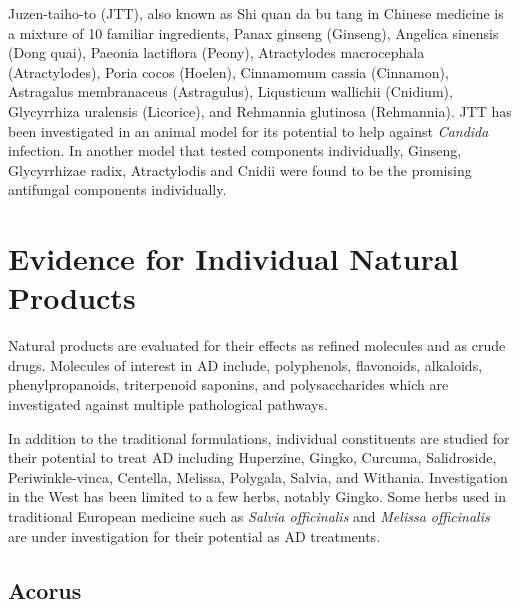 \documentclass[twocolumn]{article}
\begin{document}
Juzen-taiho-to (JTT), also known as
Shi quan da bu tang in Chinese medicine
is a mixture of 10 familiar ingredients,
Panax ginseng (Ginseng),
Angelica sinensis (Dong quai),
Paeonia lactiflora (Peony),
Atractylodes macrocephala (Atractylodes),
Poria cocos (Hoelen),
Cinnamomum cassia (Cinnamon),
Astragalus membranaceus (Astragulus),
Liqusticum wallichii (Cnidium),
Glycyrrhiza uralensis (Licorice),
and Rehmannia glutinosa (Rehmannia).
JTT has been investigated in an animal model
for its potential to help against \textit{Candida}
infection.
\cite{akagawa1996protection}
In another model that tested components individually,
Ginseng, Glycyrrhizae radix, Atractylodis and Cnidii
were found to be the promising antifungal components individually.
\cite{abe1998protective}



%
%

\section{Evidence for Individual Natural Products}


Natural products are evaluated for their effects
as refined molecules and
as crude drugs.
Molecules of interest in AD include,
polyphenols,
flavonoids,
alkaloids,
phenylpropanoids,
triterpenoid saponins,
and polysaccharides
which are investigated
against multiple pathological pathways.
\cite{
darvesh2010oxidative,
gao2013research
}

In addition to the traditional formulations,
individual constituents are studied for their potential
to treat AD including
Huperzine,
Gingko,
Curcuma,
Salidroside,
Periwinkle-vinca,
Centella,
Melissa,
Polygala,
Salvia,
and Withania.
\cite{sun2013traditional}
Investigation in the West has been limited to a few herbs,
notably Gingko. Some herbs used in traditional European medicine
such as \textit{Salvia officinalis} and \textit{Melissa officinalis}
are under investigation for their potential as AD treatments.
\cite{perry1999medicinal}



\subsection{Acorus}
\end{document}
